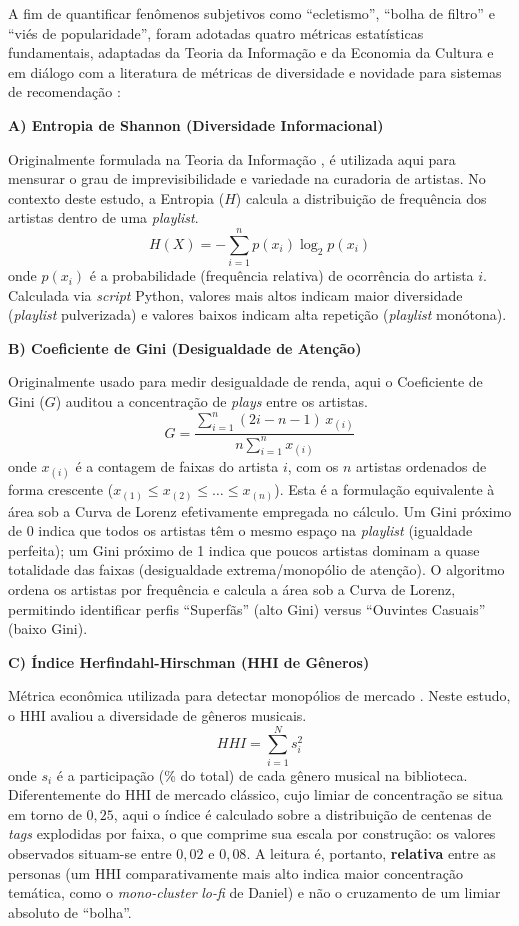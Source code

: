 \documentclass[12pt, %
openright,
oneside, %
a4paper,    %
english,   %
brazil]{facom-ufu-abntex2}
\begin{document}
A fim de quantificar fenômenos subjetivos como ``ecletismo'', ``bolha de filtro''
e ``viés de popularidade'', foram adotadas quatro métricas estatísticas
fundamentais, adaptadas da Teoria da Informação e da Economia da Cultura e em
diálogo com a literatura de métricas de diversidade e novidade para sistemas de
recomendação \cite{vargas2011rank}:

\textbf{A) Entropia de Shannon (Diversidade Informacional)}

Originalmente formulada na Teoria da Informação \cite{shannon1948mathematical}, é
utilizada aqui para mensurar o grau de imprevisibilidade e variedade na curadoria
de artistas. No contexto deste estudo, a Entropia ($H$) calcula a distribuição de
frequência dos artistas dentro de uma \emph{playlist}.
\[ H(X) = -\sum_{i=1}^{n} p(x_i) \log_2 p(x_i) \]
onde $p(x_i)$ é a probabilidade (frequência relativa) de ocorrência do artista
$i$. Calculada via \emph{script} Python, valores mais altos indicam maior
diversidade (\emph{playlist} pulverizada) e valores baixos indicam alta repetição
(\emph{playlist} monótona).

\textbf{B) Coeficiente de Gini (Desigualdade de Atenção)}

Originalmente usado para medir desigualdade de renda, aqui o Coeficiente de Gini
($G$) auditou a concentração de \emph{plays} entre os artistas.
\[ G = \frac{\sum_{i=1}^{n} (2i - n - 1)\, x_{(i)}}{n \sum_{i=1}^{n} x_{(i)}} \]
onde $x_{(i)}$ é a contagem de faixas do artista $i$, com os $n$ artistas
ordenados de forma crescente ($x_{(1)} \le x_{(2)} \le \dots \le x_{(n)}$). Esta
é a formulação equivalente à área sob a Curva de Lorenz efetivamente empregada
no cálculo. Um Gini próximo
de 0 indica que todos os artistas têm o mesmo espaço na \emph{playlist}
(igualdade perfeita); um Gini próximo de 1 indica que poucos artistas dominam a
quase totalidade das faixas (desigualdade extrema/monopólio de atenção). O
algoritmo ordena os artistas por frequência e calcula a área sob a Curva de
Lorenz, permitindo identificar perfis ``Superfãs'' (alto Gini) versus ``Ouvintes
Casuais'' (baixo Gini).

\textbf{C) Índice Herfindahl-Hirschman (HHI de Gêneros)}

Métrica econômica utilizada para detectar monopólios de mercado
\cite{rhoades1993herfindahl}. Neste estudo, o HHI avaliou a diversidade de
gêneros musicais.
\[ HHI = \sum_{i=1}^{N} s_i^2 \]
onde $s_i$ é a participação (\% do total) de cada gênero musical na biblioteca.
Diferentemente do HHI de mercado clássico, cujo limiar de concentração se
situa em torno de $0{,}25$, aqui o índice é calculado sobre a distribuição de
centenas de \emph{tags} explodidas por faixa, o que comprime sua escala por
construção: os valores observados situam-se entre $0{,}02$ e $0{,}08$. A leitura
é, portanto, \textbf{relativa} entre as personas (um HHI comparativamente mais
alto indica maior concentração temática, como o \emph{mono-cluster} \emph{lo-fi}
de Daniel) e não o cruzamento de um limiar absoluto de ``bolha''.
\end{document}
